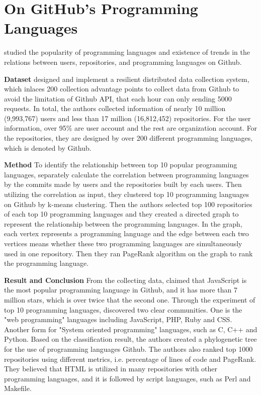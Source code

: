 \documentclass[12pt,oneside,final]{vlsithesis}
\begin{document}
\section{On GitHub's Programming Languages}
\citet{sanatinia2016github} studied the popularity of programming languages and existence of trends in the relations between users, repositories, and programming languages on Github.

\textbf{Dataset}\citet{sanatinia2016github} designed  and implement a resilient distributed data collection system, which inlaces 200 collection advantage points to collect data from Github to avoid the limitation of Github API, that each hour can only sending 5000 requests. In total, the authors collected information of nearly 10 million (9,993,767) users and less than 17 million (16,812,452) repositories. For the user information, over 95\% are user account and the rest are organization account. For the repositories, they are designed by over 200 different programming languages, which is denoted by Github.                

\textbf{Method}
To identify the relationship between top 10 popular programming languages, \citet{sanatinia2016github} separately calculate the correlation between programming languages by the commits made by users and the repositories built by each users. Then utilizing the correlation as input, they clustered top 10 programming languages on Github by k-means clustering\cite{arthur2007k}.  Then the authors selected top 100 repositories of each top 10 programming languages and they created a directed graph to represent the relationship between the programming languages. In the graph, each vertex represents a programming language and the edge between each two vertices means whether these two programming languages are simultaneously used in one repository. Then they ran PageRank algorithm\cite{page1999pagerank} on the graph to rank the programming language. 

\textbf{Result and Conclusion}
From the collecting data, \citet{sanatinia2016github} claimed that JavaScript is the most popular programming language in Github, and it has more than 7 million stars, which is over twice that the second one. Through the experiment of top 10 programming languages, \citet{sanatinia2016github} discovered two clear communities. One is the "web programming" languages including JavaScript, PHP, Ruby and CSS. Another form for "System oriented programming" languages, such as C, C++ and Python. Based on the classification result, the authors created a phylogenetic tree for the use of programming languages Github. The authors also ranked top 1000 repositories using different metrics, i.e. percentage of lines of code and PageRank. They believed that HTML is utilized in many repositories with other programming languages, and it is followed by script languages, such as Perl and Makefile. 
\end{document}
